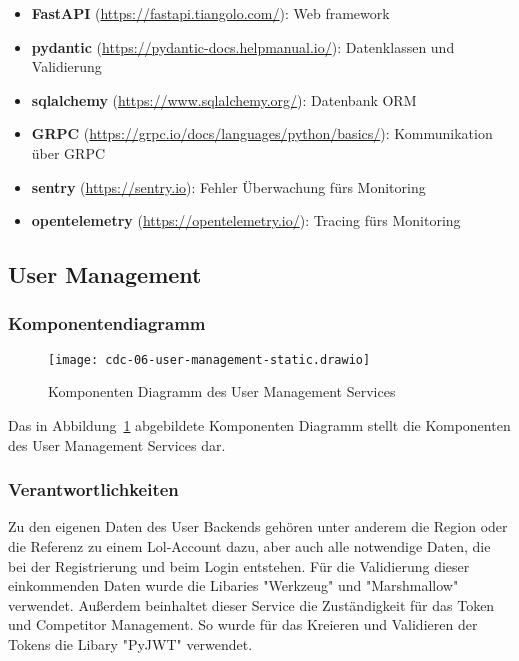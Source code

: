 \begin{itemize}
    \item \textbf{FastAPI} (\href{https://fastapi.tiangolo.com/}{https://fastapi.tiangolo.com/}): Web framework
    \item \textbf{pydantic} (\href{https://pydantic-docs.helpmanual.io/}{https://pydantic-docs.helpmanual.io/}): Datenklassen und Validierung
    \item \textbf{sqlalchemy} (\href{https://www.sqlalchemy.org/}{https://www.sqlalchemy.org/}): Datenbank ORM
    \item \textbf{GRPC} (\href{https://grpc.io/docs/languages/python/basics/}{https://grpc.io/docs/languages/python/basics/}): Kommunikation über GRPC
    \item \textbf{sentry} (\href{https://sentry.io}{https://sentry.io}): Fehler Überwachung fürs Monitoring
    \item \textbf{opentelemetry} (\href{https://opentelemetry.io/}{https://opentelemetry.io/}): Tracing fürs Monitoring
\end{itemize}

\subsection{User Management}
\subsubsection{Komponentendiagramm}\label{subsubsec:user-management-component-diagram}

\begin{figure}
    \centering
    \texttt{[image: cdc-06-user-management-static.drawio]}
    \caption{Komponenten Diagramm des User Management Services}
    \label{fig:user-management-component-diagram}
\end{figure}

Das in Abbildung~\ref{fig:user-management-component-diagram} abgebildete Komponenten Diagramm stellt die
Komponenten des User Management Services dar.

\subsubsection{Verantwortlichkeiten}
Zu den eigenen Daten des User Backends gehören unter anderem die Region oder die Referenz zu einem Lol-Account dazu, 
aber auch alle notwendige Daten, die bei der Registrierung und beim Login entstehen. Für die Validierung dieser einkommenden Daten wurde die Libaries "Werkzeug" und "Marshmallow" verwendet.
Außerdem beinhaltet dieser Service die Zuständigkeit für das Token und Competitor Management. So wurde für das Kreieren und Validieren der Tokens die Libary
"PyJWT" verwendet.
